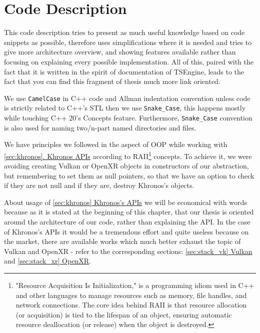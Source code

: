 \newpage
\section{Code Description}
\label{sec:code_descr}
\hspace{\parindent}
This code description tries to present as much useful knowledge based on code snippets as possible, therefore uses simplifications where it is needed and tries to give more architecture overview, and showing features available rather than focusing on explaining every possible implementation. All of this, paired with the fact that it is written in the spirit of documentation of TSEngine, leads to the fact that you can find this fragment of thesis much more link oriented.

We use \texttt{CamelCase} in C++ code and Allman indentation convention unless code is strictly related to C++'s STL then we use \texttt{Snake\_Case}, this happens mostly while touching C++ 20's Concepts feature.
Furthermore, \texttt{Snake\_Case} convention is also used for naming two/n-part named directories and files.

We have principles we followed in the aspect of OOP while working with \hyperref[sec:khronos]{\ref*{sec:khronos}. Khronos APIs} according to RAII\footnote{"Resource Acquisition Is Initialization," is a programming idiom used in C++ and other languages to manage resources such as memory, file handles, and network connections. The core idea behind RAII is that resource allocation (or acquisition) is tied to the lifespan of an object, ensuring automatic resource deallocation (or release) when the object is destroyed.} concepts. To achieve it, we were avoiding creating Vulkan or OpenXR objects in constructors of our abstraction, but remembering to set them as null pointers, so that we have an option to check if they are not null and if they are, destroy Khronos's objects.

About usage of \hyperref[sec:khronos]{\ref*{sec:khronos} Khronos's APIs} we will be economical with words because as it is stated at the beginning of this chapter, that our thesis is oriented around the architecture of our code, rather than explaining the API. In the case of Khronos's APIs it would be a tremendous effort and quite useless because on the market, there are available works which much better exhaust the topic of Vulkan and OpenXR - refer to the corresponding sections: \hyperref[sec:stack_vk]{\ref*{sec:stack_vk} Vulkan} and \hyperref[sec:stack_xr]{\ref*{sec:stack_xr} OpenXR}.

